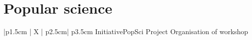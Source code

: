 \section{Popular science}
\begin{mySectionContents}
\iftrue %
\begin{myTableEnv}{|p{1.5cm} | X | p{2.5cm}| p{3.5cm}}
    \myRow
        {\myWhen}{}
        {Initiative}{PopSci Project}
    \myRow
        {\myWhat}{Organisation of workshop}
        {}{}
\end{myTableEnv}

\myTablesSeparator
\fi
\end{mySectionContents}
